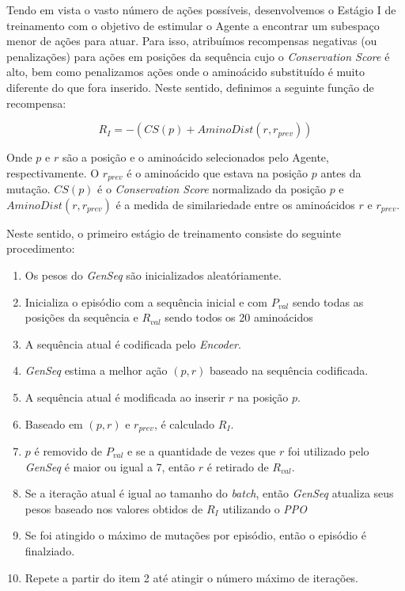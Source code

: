 Tendo em vista o vasto número de ações possíveis, 
desenvolvemos o Estágio I de treinamento com o objetivo de estimular o Agente a encontrar um subespaço menor de ações para atuar.
Para isso, atribuímos recompensas negativas (ou penalizações) para ações em posições da sequência cujo o \textit{Conservation Score} é alto,
bem como penalizamos ações onde o aminoácido substituído é muito diferente do que fora inserido. 
Neste sentido, definimos a seguinte função de recompensa:

\begin{equation}
    R_{I} = -(CS(p) + AminoDist(r, r_{prev}))
\end{equation}

\noindent
Onde $p$ e $r$ são a posição e o aminoácido selecionados pelo Agente, respectivamente. O $r_{prev}$ é o aminoácido que estava na posição $p$ antes da mutação. 
$CS(p)$ é o \textit{Conservation Score} normalizado da posição $p$ e $AminoDist(r, r_{prev})$ é a medida de similariedade entre os aminoácidos $r$ e $r_{prev}$. 

Neste sentido, o primeiro estágio de treinamento consiste do seguinte procedimento:

\begin{enumerate}
  \item Os pesos do \textit{GenSeq} são inicializados aleatóriamente.
  \item Inicializa o episódio com a sequência inicial e com $P_{val}$ sendo todas as posições da sequência e $R_{val}$ sendo todos os 20 aminoácidos 
  \item A sequência atual é codificada pelo \textit{Encoder}.
  \item \textit{GenSeq} estima a melhor ação $(p,r)$ baseado na sequência codificada. 
  \item A sequência atual é modificada ao inserir $r$ na posição $p$.
  \item Baseado em $(p,r)$ e $r_{prev}$, é calculado $R_{I}$.
  \item $p$ é removido de $P_{val}$ e se a quantidade de vezes que $r$ foi utilizado pelo \textit{GenSeq} é maior ou igual a 7, então $r$ é retirado de $R_{val}$.
  \item Se a iteração atual é igual ao tamanho do \textit{batch}, então \textit{GenSeq} atualiza seus pesos baseado nos valores obtidos de $R_{I}$ utilizando o \textit{PPO}
  \item Se foi atingido o máximo de mutações por episódio, então o episódio é finalziado.
  \item Repete a partir do item 2 até atingir o número máximo de iterações. 
\end{enumerate}


